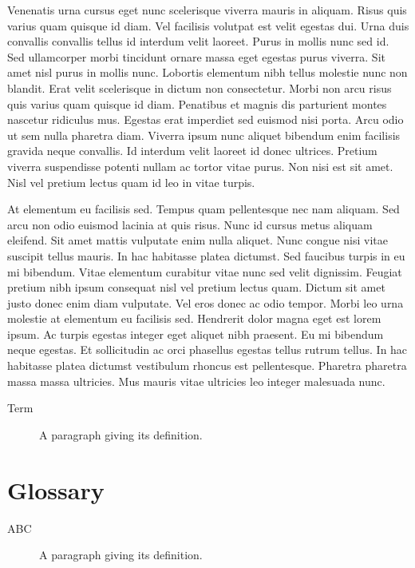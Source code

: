 \documentclass[
]{book}
\begin{document}
Venenatis urna cursus eget nunc scelerisque viverra mauris in aliquam. Risus quis varius quam quisque id diam. Vel facilisis volutpat est velit egestas dui. Urna duis convallis convallis tellus id interdum velit laoreet. Purus in mollis nunc sed id. Sed ullamcorper morbi tincidunt ornare massa eget egestas purus viverra. Sit amet nisl purus in mollis nunc. Lobortis elementum nibh tellus molestie nunc non blandit. Erat velit scelerisque in dictum non consectetur. Morbi non arcu risus quis varius quam quisque id diam. Penatibus et magnis dis parturient montes nascetur ridiculus mus. Egestas erat imperdiet sed euismod nisi porta. Arcu odio ut sem nulla pharetra diam. Viverra ipsum nunc aliquet bibendum enim facilisis gravida neque convallis. Id interdum velit laoreet id donec ultrices. Pretium viverra suspendisse potenti nullam ac tortor vitae purus. Non nisi est sit amet. Nisl vel pretium lectus quam id leo in vitae turpis.

At elementum eu facilisis sed. Tempus quam pellentesque nec nam aliquam. Sed arcu non odio euismod lacinia at quis risus. Nunc id cursus metus aliquam eleifend. Sit amet mattis vulputate enim nulla aliquet. Nunc congue nisi vitae suscipit tellus mauris. In hac habitasse platea dictumst. Sed faucibus turpis in eu mi bibendum. Vitae elementum curabitur vitae nunc sed velit dignissim. Feugiat pretium nibh ipsum consequat nisl vel pretium lectus quam. Dictum sit amet justo donec enim diam vulputate. Vel eros donec ac odio tempor. Morbi leo urna molestie at elementum eu facilisis sed. Hendrerit dolor magna eget est lorem ipsum. Ac turpis egestas integer eget aliquet nibh praesent. Eu mi bibendum neque egestas. Et sollicitudin ac orci phasellus egestas tellus rutrum tellus. In hac habitasse platea dictumst vestibulum rhoncus est pellentesque. Pharetra pharetra massa massa ultricies. Mus mauris vitae ultricies leo integer malesuada nunc.

\begin{description}
\item[\protect\hypertarget{term}{}{Term}]
A paragraph giving its definition.
\end{description}

\hypertarget{glossary}{%
\chapter*{Glossary}\label{glossary}}

\begin{description}
\item[\protect\hypertarget{abc}{}{ABC}]
A paragraph giving its definition.
\end{description}

  
\end{document}
